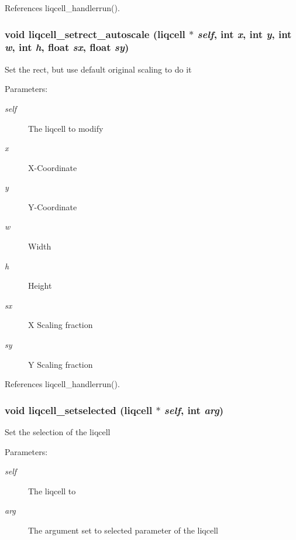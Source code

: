 References liqcell\_\-handlerrun().
\subsubsection[{liqcell\_\-setrect\_\-autoscale}]{\setlength{\rightskip}{0pt plus 5cm}void liqcell\_\-setrect\_\-autoscale (liqcell $\ast$ {\em self}, \/  int {\em x}, \/  int {\em y}, \/  int {\em w}, \/  int {\em h}, \/  float {\em sx}, \/  float {\em sy})}\label{d5/da2/liqcell_8c_b2a1589fe2adb86f5403b10615327357}


Set the rect, but use default original scaling to do it \begin{Desc}
\item[Parameters:]
\begin{description}
\item[{\em self}]The liqcell to modify \item[{\em x}]X-Coordinate \item[{\em y}]Y-Coordinate \item[{\em w}]Width \item[{\em h}]Height \item[{\em sx}]X Scaling fraction \item[{\em sy}]Y Scaling fraction \end{description}
\end{Desc}


References liqcell\_\-handlerrun().
\subsubsection[{liqcell\_\-setselected}]{\setlength{\rightskip}{0pt plus 5cm}void liqcell\_\-setselected (liqcell $\ast$ {\em self}, \/  int {\em arg})}\label{d5/da2/liqcell_8c_c163679ae4c17c687988439f46034551}


Set the selection of the liqcell \begin{Desc}
\item[Parameters:]
\begin{description}
\item[{\em self}]The liqcell to \item[{\em arg}]The argument set to selected parameter of the liqcell \end{description}
\end{Desc}
